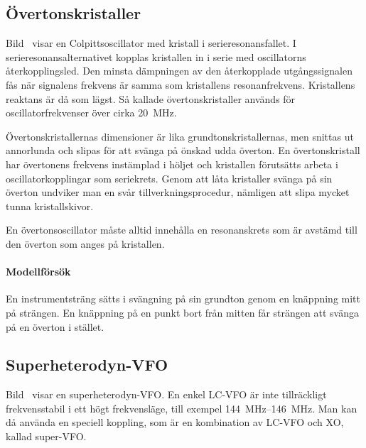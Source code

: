 \subsection{Övertonskristaller}


Bild~ visar en Colpittsoscillator med kristall i
serieresonansfallet.
I serieresonansalternativet kopplas kristallen in i serie med
oscillatorns återkopplingsled.
Den minsta dämpningen av den återkopplade utgångssignalen fås när signalens
frekvens är samma som kristallens resonanfrekvens.
Kristallens reaktans är då som lägst.
Så kallade övertonskristaller används för oscillatorfrekvenser över cirka
\qty{20}{\mega\hertz}.

Övertonskristallernas dimensioner är lika grundtonskristallernas, men
snittas ut annorlunda och slipas för att svänga på önskad udda överton.
En övertonskristall har övertonens frekvens instämplad i höljet och kristallen
förutsätts arbeta i oscillatorkopplingar som seriekrets.
Genom att låta kristaller svänga på sin överton undviker man en svår
tillverkningsprocedur, nämligen att slipa mycket tunna kristallskivor.

En övertonsoscillator måste alltid innehålla en resonanskrets som är
avstämd till den överton som anges på kristallen.

\paragraph{Modellförsök}
En instrumentsträng sätts i svängning på sin grundton genom en knäppning mitt
på strängen.
En knäppning på en punkt bort från mitten får strängen att svänga på en överton
i stället.

\subsection{Superheterodyn-VFO}
\label{superVFO}


Bild~ visar en superheterodyn-VFO.
En enkel LC-VFO är inte tillräckligt frekvensstabil i ett högt frekvensläge,
till exempel \SIrange{144}{146}{\mega\hertz}.
Man kan då använda en speciell koppling, som är en kombination av LC-VFO och
XO, kallad super-VFO.

